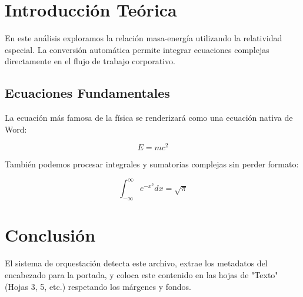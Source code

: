 \documentclass{article}
\begin{document}
\section{Introducción Teórica}
En este análisis exploramos la relación masa-energía utilizando la relatividad especial. La conversión automática permite integrar ecuaciones complejas directamente en el flujo de trabajo corporativo.

\subsection{Ecuaciones Fundamentales}
La ecuación más famosa de la física se renderizará como una ecuación nativa de Word:

\begin{equation}
    E = mc^2
\end{equation}

También podemos procesar integrales y sumatorias complejas sin perder formato:

\begin{equation}
    \int_{-\infty}^{\infty} e^{-x^2} dx = \sqrt{\pi}
\end{equation}

\section{Conclusión}
El sistema de orquestación detecta este archivo, extrae los metadatos del encabezado para la portada, y coloca este contenido en las hojas de "Texto" (Hojas 3, 5, etc.) respetando los márgenes y fondos.
\end{document}
